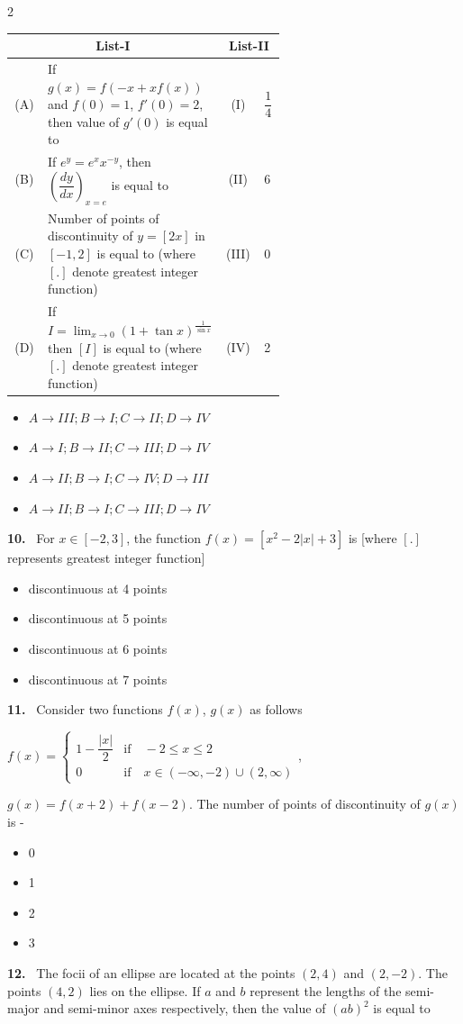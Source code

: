 \documentclass[10pt]{extarticle}
\newcommand{\qn}[1]{\par\smallskip\noindent\textbf{#1.}~}
\newenvironment{qoptions}{\begin{itemize}[leftmargin=1.8em,itemsep=1pt,topsep=2pt,label={}]}{\end{itemize}}
\newcommand{\opt}[2]{\item[(#1)] #2}
\begin{document}
\begin{multicols}{2}
{\footnotesize\setlength{\tabcolsep}{2pt}\begin{tabular}{|c|p{0.52\linewidth}|c|p{0.08\linewidth}|}
\hline
\multicolumn{2}{|c|}{\textbf{List-I}} & \multicolumn{2}{c|}{\textbf{List-II}}\\ \hline
(A) & If $g(x)=f(-x+xf(x))$ and $f(0)=1$, $f'(0)=2$, then value of $g'(0)$ is equal to & (I) & $\dfrac14$\\ \hline
(B) & If $e^y=e^xx^{-y}$, then $\left(\dfrac{dy}{dx}\right)_{x=e}$ is equal to & (II) & 6\\ \hline
(C) & Number of points of discontinuity of $y=[2x]$ in $[-1,2]$ is equal to (where $[.]$ denote greatest integer function) & (III) & 0\\ \hline
(D) & If $I=\displaystyle\lim_{x\to0}(1+\tan x)^{\frac1{\sin x}}$ then $[I]$ is equal to (where $[.]$ denote greatest integer function) & (IV) & 2\\ \hline
\end{tabular}}\par
\begin{qoptions}
\opt{A}{$A\to III;B\to I;C\to II;D\to IV$}
\opt{B}{$A\to I;B\to II;C\to III;D\to IV$}
\opt{C}{$A\to II;B\to I;C\to IV;D\to III$}
\opt{D}{$A\to II;B\to I;C\to III;D\to IV$}
\end{qoptions}
\qn{10} For $x\in[-2,3]$, the function $f(x)=\left[x^2-2|x|+3\right]$ is [where $[.]$ represents greatest integer function]
\begin{qoptions}
\opt{A}{discontinuous at 4 points}
\opt{B}{discontinuous at 5 points}
\opt{C}{discontinuous at 6 points}
\opt{D}{discontinuous at 7 points}
\end{qoptions}
\qn{11} Consider two functions $f(x)$, $g(x)$ as follows\par
$f(x)=\begin{cases}1-\dfrac{|x|}2 & \text{if}\quad -2\leqslant x\leqslant2\\ 0 & \text{if}\quad x\in(-\infty,-2)\cup(2,\infty)\end{cases}$,\par
$g(x)=f(x+2)+f(x-2)$. The number of points of discontinuity of $g(x)$ is -
\begin{qoptions}
\opt{A}{0}
\opt{B}{1}
\opt{C}{2}
\opt{D}{3}
\end{qoptions}
\qn{12} The focii of an ellipse are located at the points $(2,4)$ and $(2,-2)$. The points $(4,2)$ lies on the ellipse. If $a$ and $b$ represent the lengths of the semi-major and semi-minor axes respectively, then the value of $(ab)^2$ is equal to
\begin{qoptions}

\end{qoptions}
\end{multicols}
\end{document}
